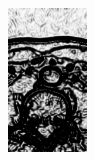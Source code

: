 \begin{frame}
\begin{columns}[b,onlytextwidth]
\begin{column}{.25\textwidth}
\begin{figure}[t]
\end{figure}
\end{column}
\begin{column}{.25\textwidth}
\begin{figure}[t]
\centering
\includegraphics[height=1.5in]{../../Figures/gac/dcm_sigmoid.eps}
\end{figure}
\end{column}
\end{columns}
\end{frame} 

